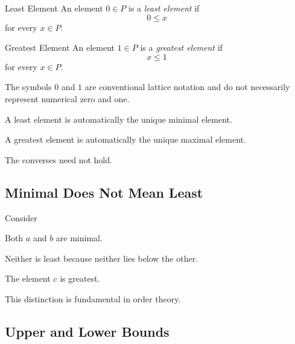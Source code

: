 \begin{definitionbox}{Least Element}
An element \(0\in P\) is a \emph{least element} if
\[ 0\leq x \]
for every \(x\in P\).
\end{definitionbox}

\begin{definitionbox}{Greatest Element}
An element \(1\in P\) is a \emph{greatest element} if
\[ x\leq1 \]
for every \(x\in P\).
\end{definitionbox}

The symbols \(0\) and \(1\) are conventional lattice notation and do not
necessarily represent numerical zero and one.

A least element is automatically the unique minimal element.

A greatest element is automatically the unique maximal element.

The converses need not hold.

\subsection{Minimal Does Not Mean Least}
\label{subsec:minimal-not-least}

Consider

\begin{center}
\end{center}

Both \(a\) and \(b\) are minimal.

Neither is least because neither lies below the other.

The element \(c\) is greatest.

This distinction is fundamental in order theory.

\subsection{Upper and Lower Bounds}
\label{subsec:upper-lower-bounds}

